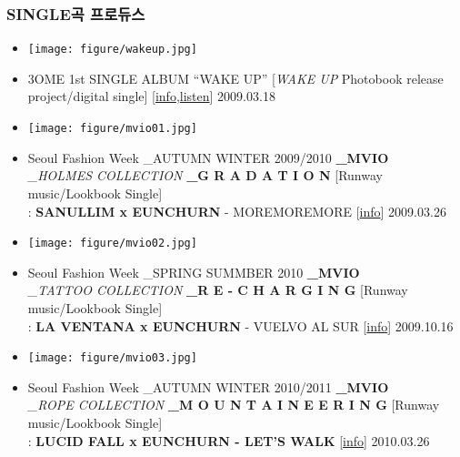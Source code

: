 \subsubsection{SINGLE곡 프로듀스}
\begin{itemize}
\item \texttt{[image: figure/wakeup.jpg]}
\item 3OME 1st SINGLE ALBUM “WAKE UP” [\textit{WAKE UP} Photobook release project/digital single] [\href{http://music.naver.com/album/index.nhn?albumId=154369&trackId=1994587}{\footnotesize{info}},\href{http://soundcloud.com/eunchurn/eunchurn-and-superslut-feat-zisung-wake-up-re-edit}{\footnotesize{listen}}] \hfill 2009.03.18
\item \texttt{[image: figure/mvio01.jpg]}
\item Seoul Fashion Week \_AUTUMN WINTER 2009/2010 \textbf{\_MVIO}\\ \textit{\_HOLMES COLLECTION} \textbf{\_G R A D A T I O N} [Runway music/Lookbook Single]\\: \textbf{SANULLIM x EUNCHURN} - MOREMOREMORE [\href{http://www.eunchurn.com/2010/05/23/mvio-by-han-sang-hyuk-autumn-winter-2009-2010-holmes-collection/}{\footnotesize{info}}] \hfill 2009.03.26
\item \texttt{[image: figure/mvio02.jpg]}
\item Seoul Fashion Week \_SPRING SUMMBER 2010 \textbf{\_MVIO}\\ \textit{\_TATTOO COLLECTION} \textbf{\_R E - C H A R G I N G} [Runway music/Lookbook Single]\\: \textbf{LA VENTANA x EUNCHURN} - VUELVO AL SUR [\href{http://www.eunchurn.com/2010/05/23/seoul-fashion-week-mvio-by-han-sang-hyuk-spring-summer-2010-re-charging/}{\footnotesize{info}}] \hfill 2009.10.16
\item \texttt{[image: figure/mvio03.jpg]}
\item Seoul Fashion Week \_AUTUMN WINTER 2010/2011 \textbf{\_MVIO}\\ \textit{\_ROPE COLLECTION} \textbf{\_M O U N T A I N E E R I N G} [Runway music/Lookbook Single]\\: \textbf{LUCID FALL x EUNCHURN - LET'S WALK} [\href{http://www.eunchurn.com/2010/08/03/seoul-fashion-week-mvio-by-han-sang-hyuk-autumn-winter-2010-2011-mounteeneering-rope-collection/}{\footnotesize{info}}] \hfill 2010.03.26

\end{itemize}
